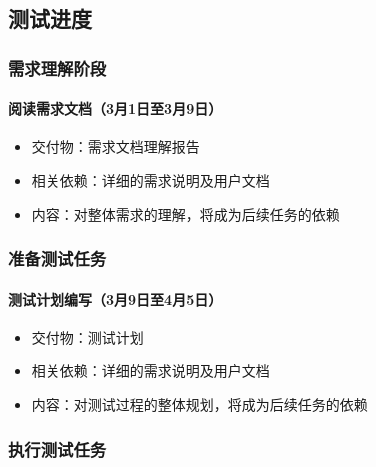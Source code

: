 \documentclass[hyperref, a4paper]{ctexart}
\providecommand{\tightlist}{%
  \setlength{\itemsep}{0pt}\setlength{\parskip}{0pt}}
\let\oldparagraph\paragraph
\renewcommand{\paragraph}[1]{\oldparagraph{#1}\mbox{}}
\begin{document}
\hypertarget{ux6d4bux8bd5ux8fdbux5ea6}{%
\subsection{测试进度}\label{ux6d4bux8bd5ux8fdbux5ea6}}

\hypertarget{ux9700ux6c42ux7406ux89e3ux9636ux6bb5}{%
\subsubsection{需求理解阶段}\label{ux9700ux6c42ux7406ux89e3ux9636ux6bb5}}

\hypertarget{ux9605ux8bfbux9700ux6c42ux6587ux68633ux67081ux65e5ux81f33ux67089ux65e5}{%
\paragraph{阅读需求文档（3月1日至3月9日）}\label{ux9605ux8bfbux9700ux6c42ux6587ux68633ux67081ux65e5ux81f33ux67089ux65e5}}

\begin{itemize}
\tightlist
\item
  交付物：需求文档理解报告
\item
  相关依赖：详细的需求说明及用户文档
\item
  内容：对整体需求的理解，将成为后续任务的依赖
\end{itemize}

\hypertarget{ux51c6ux5907ux6d4bux8bd5ux4efbux52a1}{%
\subsubsection{准备测试任务}\label{ux51c6ux5907ux6d4bux8bd5ux4efbux52a1}}

\hypertarget{ux6d4bux8bd5ux8ba1ux5212ux7f16ux51993ux67089ux65e5ux81f34ux67085ux65e5}{%
\paragraph{测试计划编写（3月9日至4月5日）}\label{ux6d4bux8bd5ux8ba1ux5212ux7f16ux51993ux67089ux65e5ux81f34ux67085ux65e5}}

\begin{itemize}
\tightlist
\item
  交付物：测试计划
\item
  相关依赖：详细的需求说明及用户文档
\item
  内容：对测试过程的整体规划，将成为后续任务的依赖
\end{itemize}

\hypertarget{ux6267ux884cux6d4bux8bd5ux4efbux52a1}{%
\subsubsection{执行测试任务}\label{ux6267ux884cux6d4bux8bd5ux4efbux52a1}}
\end{document}
